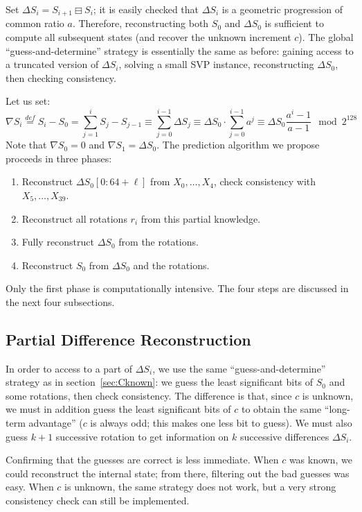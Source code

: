 \documentclass[submission,svgnames,journal=tosc]{iacrtrans}
\begin{document}
Set $\Delta S_i = S_{i+1} \boxminus S_i$; it is easily checked that $\Delta S_i$ is a
geometric progression of common ratio $a$. Therefore, reconstructing both $S_0$
and $\Delta S_0$ is sufficient to compute all subsequent states (and recover the
unknown increment $c$). The global ``guess-and-determine'' strategy is
essentially the same as before: gaining access to a truncated version of
$\Delta S_i$, solving a small SVP instance, reconstructing $\Delta S_0$, then
checking consistency.

Let us set:
\begin{equation}\label{eq:nabla}
  \nabla S_i \stackrel{def}{=} S_i - S_0 = \sum_{j=1}^i S_j - S_{j-1} \equiv \sum_{j=0}^{i-1} \Delta S_j \equiv \Delta S_0 \cdot \sum_{j=0}^{i-1} a^j \equiv \Delta S_0 \frac{a^i-1}{a-1} \mod 2^{128}
\end{equation}
Note that $\nabla S_0 = 0$ and $\nabla S_1 = \Delta S_0$. The prediction algorithm we propose proceeds in three phases:
\begin{enumerate}
\item Reconstruct $\Delta S_0[0:64+\ell]$ from $X_0, \dots, X_{4}$, check consistency with $X_5, \dots, X_{39}$.
\item Reconstruct all rotations $r_i$ from this partial knowledge.
\item Fully reconstruct $\Delta S_0$ from the rotations.
\item Reconstruct $S_0$ from $\Delta S_0$ and the rotations.
\end{enumerate}

\noindent Only the first phase is computationally intensive. The four steps are discussed in the next four subsections.

\subsection{Partial Difference Reconstruction}

In order to access to a part of $\Delta S_i$, we use the same
``guess-and-determine'' strategy as in section~\ref{sec:Cknown}: we guess the
least significant bits of $S_0$ and some rotations, then check consistency. The
difference is that, since $c$ is unknown, we must in addition guess the least
significant bits of $c$ to obtain the same ``long-term advantage'' ($c$ is
always odd; this makes one less bit to guess). We must also guess $k+1$
successive rotation to get information on $k$ successive differences
$\Delta S_i$.

Confirming that the guesses are correct is less immediate. When $c$ was known,
we could reconstruct the internal state; from there, filtering out the bad
guesses was easy. When $c$ is unknown, the same strategy does not work, but a
very strong consistency check can still be implemented. %
\end{document}
